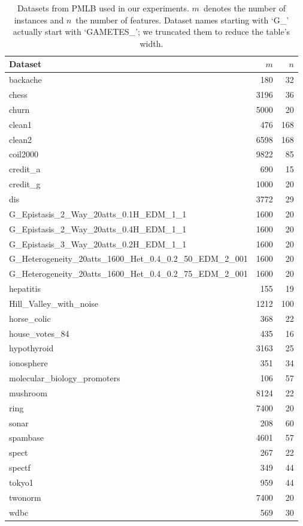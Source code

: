 \documentclass{article}
\theoremstyle{definition}
\begin{document}
\begin{table}[htbp]
	\centering
	\begin{tabular}{lrr}
		\toprule
		Dataset & $m$ & $n$ \\
		\midrule
		backache & 180 & 32 \\
		chess & 3196 & 36 \\
		churn & 5000 & 20 \\
		clean1 & 476 & 168 \\
		clean2 & 6598 & 168 \\
		coil2000 & 9822 & 85 \\
		credit\_a & 690 & 15 \\
		credit\_g & 1000 & 20 \\
		dis & 3772 & 29 \\
		G\_Epistasis\_2\_Way\_20atts\_0.1H\_EDM\_1\_1 & 1600 & 20 \\
		G\_Epistasis\_2\_Way\_20atts\_0.4H\_EDM\_1\_1 & 1600 & 20 \\
		G\_Epistasis\_3\_Way\_20atts\_0.2H\_EDM\_1\_1 & 1600 & 20 \\
		G\_Heterogeneity\_20atts\_1600\_Het\_0.4\_0.2\_50\_EDM\_2\_001 & 1600 & 20 \\
		G\_Heterogeneity\_20atts\_1600\_Het\_0.4\_0.2\_75\_EDM\_2\_001 & 1600 & 20 \\
		hepatitis & 155 & 19 \\
		Hill\_Valley\_with\_noise & 1212 & 100 \\
		horse\_colic & 368 & 22 \\
		house\_votes\_84 & 435 & 16 \\
		hypothyroid & 3163 & 25 \\
		ionosphere & 351 & 34 \\
		molecular\_biology\_promoters & 106 & 57 \\
		mushroom & 8124 & 22 \\
		ring & 7400 & 20 \\
		sonar & 208 & 60 \\
		spambase & 4601 & 57 \\
		spect & 267 & 22 \\
		spectf & 349 & 44 \\
		tokyo1 & 959 & 44 \\
		twonorm & 7400 & 20 \\
		wdbc & 569 & 30 \\
		\bottomrule
	\end{tabular}
	\caption{
		Datasets from PMLB used in our experiments.
		$m$~denotes the number of instances and $n$~the number of features.
		Dataset names starting with `G\_' actually start with `GAMETES\_'; we truncated them to reduce the table's width.
	}
	\label{tab:afs:datasets}
\end{table}
\end{document}
